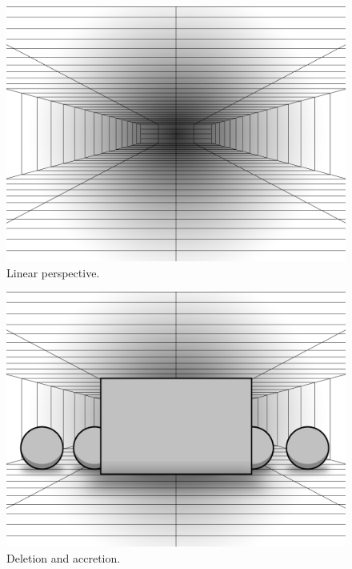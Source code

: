 \begin{figure}[H]
	\centering
	\includegraphics[width=1\linewidth]{figure/Analysis/linearPerspective.png}
	\caption{Linear perspective.}
	\label{fig:linearPerspective}
\end{figure}




\begin{figure}[H]
	\centering
	\includegraphics[width=1\linewidth]{figure/Analysis/deletionAccretion.png}
	\caption{Deletion and accretion.}
	\label{fig:deletionAccretion}
\end{figure}

